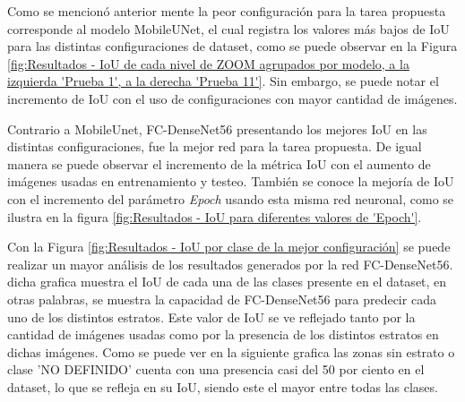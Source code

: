 
Como se mencionó anterior mente la peor configuración para la tarea propuesta corresponde al modelo MobileUNet, el cual registra los valores más bajos de IoU para las distintas configuraciones de dataset, como se puede observar en la Figura  \ref{fig:Resultados - IoU de cada nivel de ZOOM agrupados por modelo, a la izquierda 'Prueba 1', a la derecha 'Prueba 11'}. Sin embargo, se puede notar el incremento de IoU con el uso de configuraciones con mayor cantidad de imágenes. 


Contrario a MobileUnet, FC-DenseNet56 presentando los mejores IoU en las distintas configuraciones, fue la mejor red para la tarea propuesta. De igual manera se puede observar el incremento de la métrica IoU con el aumento de imágenes usadas en entrenamiento y testeo. También se conoce la mejoría de IoU con el incremento del parámetro \textit{Epoch} usando esta misma red neuronal, como se ilustra en la figura \ref{fig:Resultados - IoU para diferentes valores de 'Epoch'}. 


Con la Figura \ref{fig:Resultados - IoU por clase de la mejor configuración} se puede realizar un mayor análisis de los resultados generados por la red FC-DenseNet56. dicha grafica muestra el IoU de cada una de las clases presente en el dataset, en otras palabras, se muestra la capacidad de FC-DenseNet56 para predecir cada uno de los distintos estratos. Este valor de IoU se ve reflejado tanto por la cantidad de imágenes usadas como por la presencia de los distintos estratos en dichas imágenes. Como se puede ver en la siguiente grafica las zonas sin estrato o clase 'NO DEFINIDO' cuenta con una presencia casi del 50 por ciento en el dataset, lo que se refleja en su IoU, siendo este el mayor entre todas las clases. 


